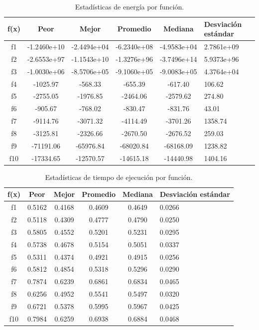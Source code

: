 \documentclass[12pt,twoside]{article}
\begin{document}
	\begin{table}[h]
		\centering
		\begin{tabular}{|c|c|c|c|c|p{2.1cm}|}  
			\hline
			\textbf{f(x)} & \textbf{Peor} & \textbf{Mejor} & \textbf{Promedio} & \textbf{Mediana} & \textbf{Desviación estándar} \\  
			\hline
			f1  & -1.2460e+10 & -2.4494e+04 & -6.2340e+08 & -4.9583e+04 & 2.7861e+09 \\
			f2  & -2.6553e+97  & -1.1543e+10  & -1.3276e+96  & -3.7496e+14  & 5.9373e+96 \\
			f3  & -1.0030e+06  & -8.5706e+05  & -9.1060e+05  & -9.0083e+05  & 4.3764e+04 \\
			f4  & -1025.97     & -568.33     & -655.39     & -617.40     & 106.62 \\
			f5  & -2755.05     & -1976.85    & -2464.06    & -2579.62    & 274.80 \\
			f6  & -905.67      & -768.02     & -830.47     & -831.76     & 43.01 \\
			f7  & -9114.76     & -3071.32    & -4114.49    & -3701.26    & 1358.74 \\
			f8  & -3125.81     & -2326.66    & -2670.50    & -2676.52    & 259.03 \\
			f9  & -71191.06    & -65976.84   & -68020.84   & -68168.09   & 1238.82 \\
			f10 & -17334.65    & -12570.57   & -14615.18   & -14440.98   & 1404.16 \\
			\hline
		\end{tabular}
		\caption{Estadísticas de energía por función.}
		\label{tab:energy}
	\end{table}
	
	
	
	
	\begin{table}[h]
		\centering
		\begin{tabular}{|c|c|c|c|c|p{2.1cm}|}  
			\hline
			\textbf{f(x)} & \textbf{Peor} & \textbf{Mejor} & \textbf{Promedio} & \textbf{Mediana} & \textbf{Desviación estándar} \\  
			\hline
			f1  & 0.5162 & 0.4168 & 0.4609 & 0.4649 & 0.0266 \\
			f2  & 0.5118 & 0.4309 & 0.4777 & 0.4790 & 0.0250 \\
			f3  & 0.5805 & 0.4552 & 0.5201 & 0.5231 & 0.0295 \\
			f4  & 0.5738 & 0.4678 & 0.5154 & 0.5051 & 0.0337 \\
			f5  & 0.5311 & 0.4374 & 0.4921 & 0.4915 & 0.0256 \\
			f6  & 0.5812 & 0.4854 & 0.5318 & 0.5296 & 0.0290 \\
			f7  & 0.7874 & 0.6239 & 0.6861 & 0.6834 & 0.0465 \\
			f8  & 0.6256 & 0.4952 & 0.5541 & 0.5497 & 0.0320 \\
			f9  & 0.6721 & 0.5378 & 0.5995 & 0.5967 & 0.0425 \\
			f10 & 0.7984 & 0.6259 & 0.6938 & 0.6884 & 0.0468 \\
			\hline
		\end{tabular}
		\caption{Estadísticas de tiempo de ejecución por función.}
		\label{tab:tiempo}
	\end{table}
	
\end{document}
